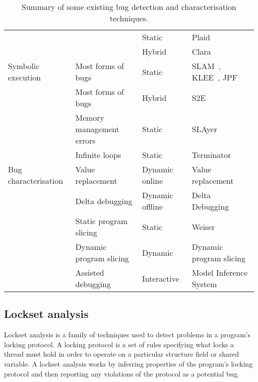 \begin{sidewaystable}
\begin{tabular}{l>{\raggedright}p{5.5cm}lp{11cm}}
                               &                                                                             & Static  & Plaid~\cite{Sunshine2011}\\
                               &                                                                             & Hybrid  & Clara~\cite{Bodden2010}\\
    \hdashline
    Symbolic execution         & Most forms of bugs                           & Static          & SLAM~\cite{Ball2011}, KLEE~\cite{Cadar}, JPF~\cite{Havelund2000} \\
                               & Most forms of bugs                           & Hybrid          & S2E\cite{Chipounov2011} \\
                               & Memory management errors                     & Static          & SLAyer\cite{Berdine2011} \\
                               & Infinite loops                               & Static          & Terminator\cite{Cook2006a} \\
    \hline
    Bug characterisation       & Value replacement                            & Dynamic online  & Value replacement~\cite{Jeffrey2009} \\
                               & Delta debugging                              & Dynamic offline & Delta Debugging~\cite{Cleve2005,Choi2002} \\
                               & Static program slicing                       & Static          & Weiser~\cite{Weiser1981} \\
                               & Dynamic program slicing                      & Dynamic         & Dynamic program slicing~\cite{Agrawal1990a} \\
                               & Assisted debugging                           & Interactive     & Model Inference System~\cite{Shapiro1982} \\
  \end{tabular}
  \caption{Summary of some existing bug detection and characterisation
    techniques.}
  \label{table:rw:find_char}
\end{sidewaystable}

\subsection{Lockset analysis}

Lockset analysis is a family of techniques used to detect problems in
a program's locking protocol.  A locking protocol is a set of rules
specifying what locks a thread must hold in order to operate on a
particular structure field or shared variable.  A lockset analysis
works by inferring properties of the program's locking protocol and
then reporting any violations of the protocol as a potential bug.

